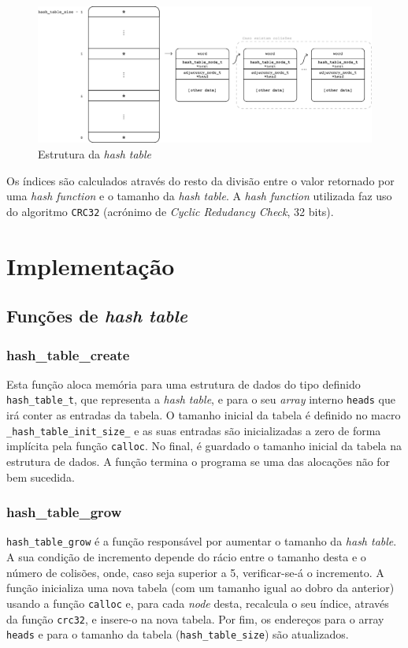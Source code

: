 \documentclass[portuguese,11pt,a4paper,titlepage]{article}
\newcommand{\foreign}[1]{\textit{#1}}
\begin{document}
\begin{figure}[h]
	\centering
	\includegraphics[width=\textwidth]{assets/hash_table-structure.pdf}
	\caption{Estrutura da \textit{hash table}}
	\label{fig:hash_table}
\end{figure}

Os índices são calculados através do resto da divisão entre o valor retornado por uma \textit{hash function} e o tamanho da \textit{hash table}. A \textit{hash function} utilizada faz uso do algoritmo \verb|CRC32| (acrónimo de \textit{Cyclic Redudancy Check}, 32 bits).

\section{Implementação}
\subsection{Funções de \textit{hash table}}

\subsubsection{hash\_table\_create}
Esta função aloca memória para uma estrutura de dados do tipo definido \verb|hash_table_t|, que representa a \foreign{hash table}, e para o seu \foreign{array} interno \verb|heads| que irá conter as entradas da tabela. O tamanho inicial da tabela é definido no macro
\verb|_hash_table_init_size_| e as suas entradas são inicializadas a zero de forma implícita pela
função \verb|calloc|. No final, é guardado o tamanho inicial da tabela na estrutura de dados. A função termina o programa se uma das alocações não for bem sucedida.

\subsubsection{hash\_table\_grow}
\verb|hash_table_grow| é a função responsável por aumentar o tamanho da \foreign{hash table}. A sua condição de incremento depende do rácio entre o tamanho desta e o número de colisões, onde, caso seja superior a 5, verificar-se-á o incremento. A função inicializa uma nova tabela (com um tamanho igual ao dobro da anterior) usando a função \verb|calloc| e, para cada \textit{node} desta, recalcula o seu índice, através da função \verb|crc32|, e insere-o na nova tabela. Por fim, os endereços para o array \verb|heads| e para o tamanho da tabela (\verb|hash_table_size|) são atualizados.
\end{document}
